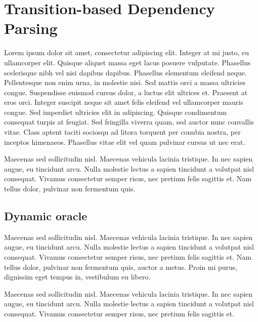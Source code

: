 \documentclass[11pt,letterpaper]{article}
\begin{document}
\section{Transition-based Dependency Parsing}
Lorem ipsum dolor sit amet, consectetur adipiscing elit. Integer at mi justo, eu ullamcorper elit. Quisque aliquet massa eget lacus posuere vulputate. Phasellus scelerisque nibh vel nisi dapibus dapibus. Phasellus elementum eleifend neque. Pellentesque non enim urna, in molestie nisi. Sed mattis orci a massa ultricies congue. Suspendisse euismod cursus dolor, a luctus elit ultrices et. Praesent at eros orci. Integer suscipit neque sit amet felis eleifend vel ullamcorper mauris congue. Sed imperdiet ultricies elit in adipiscing. Quisque condimentum consequat turpis at feugiat. Sed fringilla viverra quam, sed auctor nunc convallis vitae. Class aptent taciti sociosqu ad litora torquent per conubia nostra, per inceptos himenaeos. Phasellus vitae elit vel quam pulvinar cursus ut nec erat.

Maecenas sed sollicitudin nisl. Maecenas vehicula lacinia tristique. In nec sapien augue, eu tincidunt arcu. Nulla molestie lectus a sapien tincidunt a volutpat nisl consequat. Vivamus consectetur semper risus, nec pretium felis sagittis et. Nam tellus dolor, pulvinar non fermentum quis.

\subsection{Dynamic oracle}

Maecenas sed sollicitudin nisl. Maecenas vehicula lacinia tristique. In nec sapien augue, eu tincidunt arcu. Nulla molestie lectus a sapien tincidunt a volutpat nisl consequat. Vivamus consectetur semper risus, nec pretium felis sagittis et. Nam tellus dolor, pulvinar non fermentum quis, auctor a metus. Proin mi purus, dignissim eget tempus in, vestibulum eu libero.


Maecenas sed sollicitudin nisl. Maecenas vehicula lacinia tristique. In nec sapien augue, eu tincidunt arcu. Nulla molestie lectus a sapien tincidunt a volutpat nisl consequat. Vivamus consectetur semper risus, nec pretium felis sagittis et. 

\end{document}
